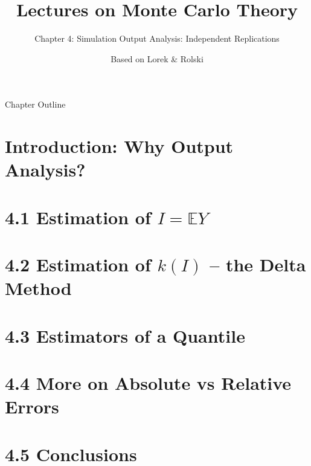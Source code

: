 \documentclass[aspectratio=169,10pt]{beamer}
\title[MC Theory -- Ch.4]{Lectures on Monte Carlo Theory}
\subtitle{Chapter 4: Simulation Output Analysis: Independent Replications}
\author{Based on Lorek \& Rolski}
\date{}
\begin{document}
\begin{frame}
  \titlepage
\end{frame}

\begin{frame}{Chapter Outline}
  \tableofcontents
\end{frame}

\section{Introduction: Why Output Analysis?}
\section{4.1 Estimation of $I = \mathbb{E}Y$}
\section{4.2 Estimation of $k(I)$ -- the Delta Method}
\section{4.3 Estimators of a Quantile}
\section{4.4 More on Absolute vs Relative Errors}
\section{4.5 Conclusions}

\end{document}
